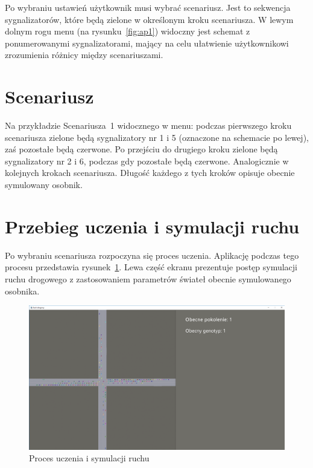 Po wybraniu ustawień użytkownik musi wybrać scenariusz. Jest to sekwencja sygnalizatorów, które będą zielone w określonym kroku scenariusza. W lewym dolnym rogu menu (na rysunku~\ref{fig:ap1}) widoczny jest schemat z ponumerowanymi sygnalizatorami, mający na celu ułatwienie użytkownikowi zrozumienia różnicy między scenariuszami. 
\section*{Scenariusz} Na przykładzie Scenariusza~1 widocznego w menu: podczas pierwszego kroku scenariusza zielone będą sygnalizatory nr 1 i 5 (oznaczone na schemacie po lewej), zaś pozostałe będą czerwone. Po przejściu do drugiego kroku zielone będą sygnalizatory nr 2 i 6, podczas gdy pozostałe będą czerwone. Analogicznie w kolejnych krokach scenariusza. Długość każdego z tych kroków opisuje obecnie symulowany osobnik.
\section*{Przebieg uczenia i symulacji ruchu}
Po wybraniu scenariusza rozpoczyna się proces uczenia. Aplikację podczas tego procesu przedstawia rysunek~\ref{fig:ap2}. Lewa część ekranu prezentuje postęp symulacji ruchu drogowego z zastosowaniem parametrów świateł obecnie symulowanego osobnika.
\begin{figure}[h]
	\centering
	\includegraphics[width=1\linewidth]{ap2}
	\caption[Proces uczenia i symulacji ruchu]{Proces uczenia i symulacji ruchu}
	\label{fig:ap2}
\end{figure}


